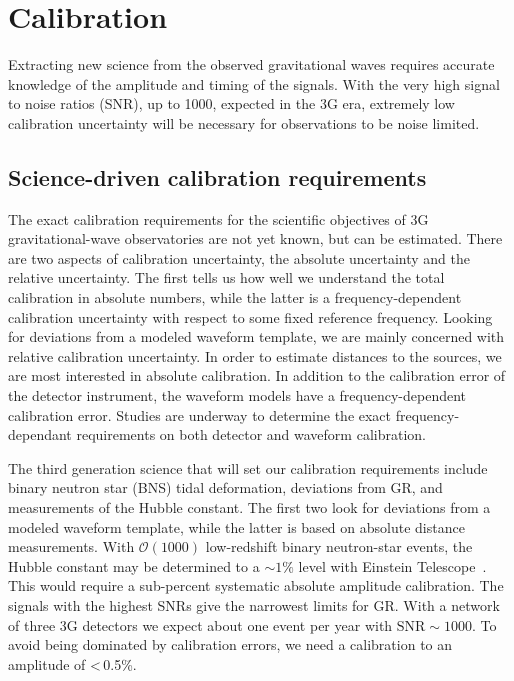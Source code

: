 \chapter{Calibration}
\label{sec:Calibration}

Extracting new science from the observed gravitational waves requires accurate knowledge of the amplitude and timing of the signals. With the very high signal to noise ratios (SNR), up to 1000, expected in the 3G era, extremely low calibration uncertainty will be necessary for observations to be noise limited.

\section{Science-driven calibration requirements}
The exact calibration requirements for the scientific objectives of 3G gravitational-wave observatories are not yet known, but can be estimated. There are two aspects of calibration uncertainty, the absolute uncertainty and the relative uncertainty. The first tells us how well we understand the total calibration in absolute numbers, while the latter is a frequency-dependent calibration uncertainty with respect to some fixed reference frequency. 
Looking for deviations from a modeled waveform template, we are mainly concerned with relative calibration uncertainty. In order to estimate distances to the sources, we are most interested in absolute calibration. In addition to the calibration error of the detector instrument, the waveform models have a frequency-dependent calibration error. Studies are underway to determine the exact frequency-dependant requirements on both detector and waveform calibration.

The third generation science that will set our calibration requirements include binary neutron star (BNS) tidal deformation, deviations from GR, and measurements of the Hubble constant. The first two look for deviations from a modeled waveform template, while the latter is based on absolute distance measurements. With $\mathcal{O}(1000)$ low-redshift binary neutron-star events, the Hubble constant may be determined to a ${\sim}1\%$ level with Einstein Telescope~\cite{Cai:2016sby}.
This would require a sub-percent systematic absolute amplitude calibration.
The signals with the highest SNRs give the narrowest limits for GR. With a network of three 3G detectors we expect about one event per year with $\text{SNR} \sim 1000$. To avoid being dominated by calibration errors, we need a calibration to an amplitude of <\,0.5\%.

